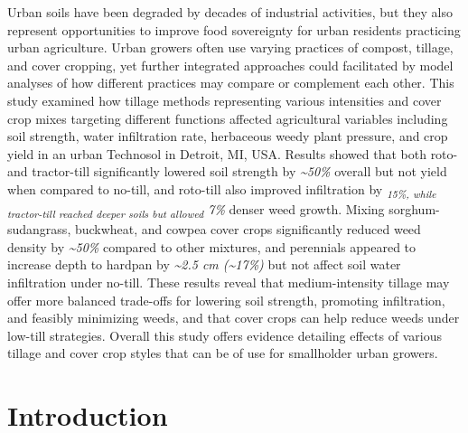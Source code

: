 \documentclass[
  12pt,
]{article}
\begin{document}
Urban soils have been degraded by decades of industrial activities, but they also represent opportunities to improve food sovereignty for urban residents practicing urban agriculture.
Urban growers often use varying practices of compost, tillage, and cover cropping, yet further integrated approaches could facilitated by model analyses of how different practices may compare or complement each other.
This study examined how tillage methods representing various intensities and cover crop mixes targeting different functions affected agricultural variables including soil strength, water infiltration rate, herbaceous weedy plant pressure, and crop yield in an urban Technosol in Detroit, MI, USA.
Results showed that both roto- and tractor-till significantly lowered soil strength by \emph{\textasciitilde50\%} overall but not yield when compared to no-till, and roto-till also improved infiltration by \emph{\textsubscript{15\%\emph{, while tractor-till reached deeper soils but allowed }}7\%} denser weed growth.
Mixing sorghum-sudangrass, buckwheat, and cowpea cover crops significantly reduced weed density by \emph{\textasciitilde50\%} compared to other mixtures, and perennials appeared to increase depth to hardpan by \emph{\textasciitilde2.5 cm (\textasciitilde17\%)} but not affect soil water infiltration under no-till.
These results reveal that medium-intensity tillage may offer more balanced trade-offs for lowering soil strength, promoting infiltration, and feasibly minimizing weeds, and that cover crops can help reduce weeds under low-till strategies.
Overall this study offers evidence detailing effects of various tillage and cover crop styles that can be of use for smallholder urban growers.

\newpage

\hypertarget{introduction}{%
\section{Introduction}\label{introduction}}
\end{document}
